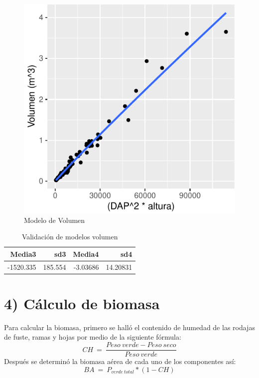 \documentclass[9pt,onecolumn,twoside,]{pinp}
\begin{document}
\begin{figure}

{\centering \includegraphics{David_Londono_Lopera_Cristian_Ganan_parcial3_files/figure-latex/unnamed-chunk-10-1} 

}

\caption{Modelo de Volumen}\label{fig:unnamed-chunk-10}
\end{figure}

\begin{table}

\caption{\label{tab:unnamed-chunk-11}Validación de modelos volumen}
\centering
\begin{tabular}[t]{r|r|r|r}
\hline
Media3 & sd3 & Media4 & sd4\\
\hline
-1520.335 & 185.554 & -3.03686 & 14.20831\\
\hline
\end{tabular}
\end{table}

\hypertarget{cálculo-de-biomasa}{%
\section{4) Cálculo de biomasa}\label{cálculo-de-biomasa}}

Para calcular la biomasa, primero se halló el contenido de humedad de
las rodajas de fuste, ramas y hojas por medio de la siguiente fórmula:
\[CH \ = \ \frac{Peso \ verde-Peso \ seco}{Peso \ verde}\] Después se
determinó la biomasa aérea de cada uno de los componentes así:
\[BA \ = \ P_{verde \ total}* (1-CH)\]
\end{document}
